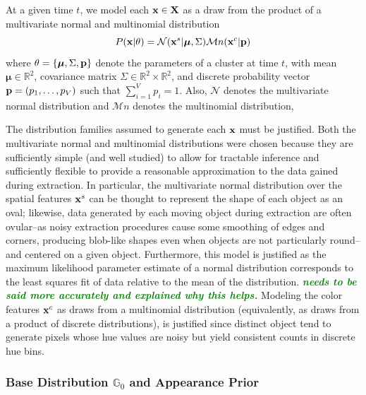 \documentclass{article}
\newcommand{\willie}[1]{\textcolor{green}{\textsf{\emph{\textbf{\textcolor{green}{#1}}}}}}
\begin{document}
At a given time $t$, we model each $\bold{x} \in \bold{X}$ as a draw from the product of a multivariate normal and multinomial distribution
\begin{equation}
P(\bold{x}|\theta) = \mathcal{N}(\bold{x}^{s} | \boldsymbol{\mu}, \Sigma)  \mathcal{M}n(\bold{x}^{c} | \bold{p})
\end{equation}
where $\theta = \{ \boldsymbol{\mu}, \Sigma, \bold{p} \}$ denote the parameters of a cluster at time $t$, with mean $\boldsymbol{\mu} \in \mathbb{R}^{2}$, covariance matrix $\Sigma \in \mathbb{R}^{2} \times \mathbb{R}^{2}$, and discrete probability vector $\bold{p} = (p_{1}, \ldots, p_{V})$ such that $\sum_{i=1}^{V}p_{i} = 1$. Also, $\mathcal{N}$ denotes the multivariate normal distribution and $\mathcal{M}n$ denotes the multinomial distribution, 

The distribution families assumed to generate each $\bold{x}$ must be justified. Both the multivariate normal and multinomial distributions were chosen because they are sufficiently simple (and well studied) to allow for tractable inference and sufficiently flexible to provide a reasonable approximation to the data gained during extraction. In particular, the multivariate normal distribution over the spatial features $\bold{x}^{s}$ can be thought to represent the shape of each object as an oval; likewise, data generated by each moving object during extraction are often ovular--as noisy extraction procedures cause some smoothing of edges and corners, producing blob-like shapes even when objects are not particularly round--and centered on a given object. Furthermore, this model is justified as the maximum likelihood parameter estimate of a normal distribution corresponds to the least squares fit of data relative to the mean of the distribution. \willie{needs to be said more accurately and explained why this helps.} Modeling the color features $\bold{x}^{c}$ as draws from a multinomial distribution (equivalently, as draws from a product of discrete distributions), is justified since distinct object tend to generate pixels whose hue values are noisy but yield consistent counts in discrete hue bins.



\subsubsection{Base Distribution $\mathbb{G}_{0}$ and Appearance Prior}
\end{document}
